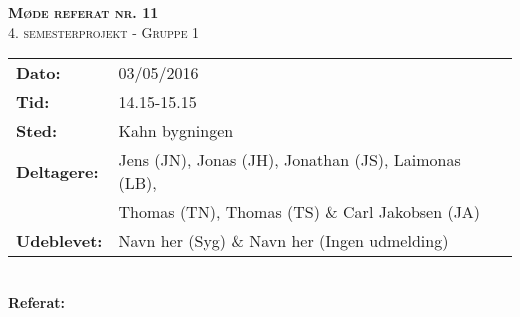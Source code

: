 
\newcommand{\HRule}{\rule{\linewidth}{0.1mm}}


	\begin{center}
		{\huge \bfseries \textsc{Møde referat nr. 11}}\\
		\textsc{\large 4. semesterprojekt - Gruppe 1}\\[0.3cm]
	\end{center}
	\begin{tabular}{ll}
	\large \textbf{Dato:} & 03/05/2016  \\ %
	\large \textbf{Tid:}  & 14.15-15.15 \\ %
	\large \textbf{Sted:} & Kahn bygningen	\\ %
	\large \textbf{Deltagere:} & Jens (JN), Jonas (JH), Jonathan (JS), Laimonas (LB), \\
	\large \textbf & Thomas (TN),  Thomas (TS) \& Carl Jakobsen (JA)\\
	\large \textbf{Udeblevet:} & Navn her (Syg) \& Navn her (Ingen udmelding)	\\
	\end{tabular}\\
	\phantom{\,}\hspace{0.1em} \large \textbf{Referat:}
